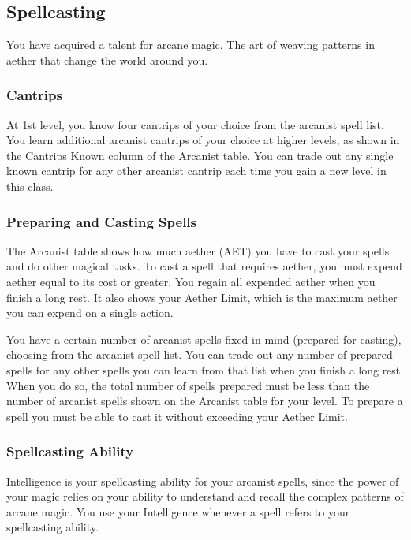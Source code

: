 \subsection{Spellcasting}

You have acquired a talent for arcane magic. The art of weaving patterns in aether that change the world around you.

\subsubsection{Cantrips}

At 1st level, you know four cantrips of your choice from the arcanist spell list. You learn additional arcanist cantrips of your choice at higher levels, as shown in the Cantrips Known column of the Arcanist table. You can trade out any single known cantrip for any other arcanist cantrip each time you gain a new level in this class.

\subsubsection{Preparing and Casting Spells}

The Arcanist table shows how much aether (AET) you have to cast your spells and do other magical tasks. To cast a spell that requires aether, you must expend aether equal to its cost or greater. You regain all expended aether when you finish a long rest. It also shows your Aether Limit, which is the maximum aether you can expend on a single action.

You have a certain number of arcanist spells fixed in mind (prepared for casting), choosing from the arcanist spell list. You can trade out any number of prepared spells for any other spells you can learn from that list when you finish a long rest. When you do so, the total number of spells prepared must be less than the number of arcanist spells shown on the Arcanist table for your level. To prepare a spell you must be able to cast it without exceeding your Aether Limit.

\subsubsection{Spellcasting Ability}

Intelligence is your spellcasting ability for your arcanist spells, since the power of your magic relies on your ability to understand and recall the complex patterns of arcane magic. You use your Intelligence whenever a spell refers to your spellcasting ability. 

